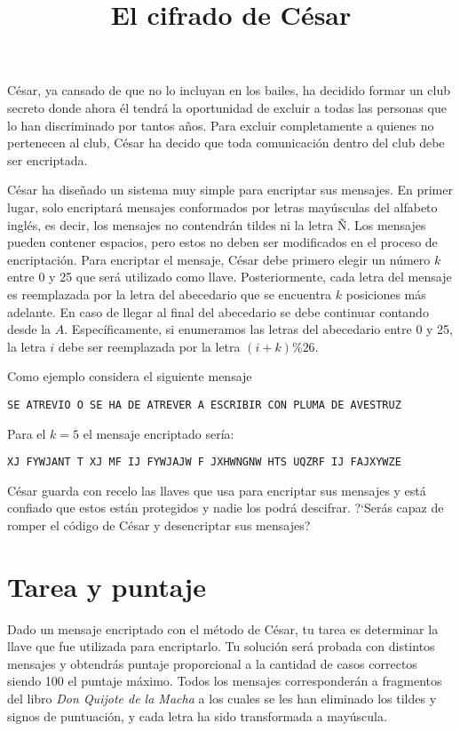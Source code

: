 \documentclass{oci}
\title{El cifrado de César}
\begin{document}
\begin{problemDescription}
César, ya cansado de que no lo incluyan en los bailes, ha decidido formar un club secreto
donde ahora él tendrá la oportunidad de excluir a todas las personas que lo han discriminado por
tantos años.
Para excluir completamente a quienes no pertenecen al club, César ha decido que toda comunicación
dentro del club debe ser encriptada.

César ha diseñado un sistema muy simple para encriptar sus mensajes.
En primer lugar, solo encriptará mensajes conformados por letras mayúsculas del alfabeto
inglés, es decir, los mensajes no contendrán tildes ni la letra Ñ.
Los mensajes pueden contener espacios, pero estos no deben ser modificados en el proceso de
encriptación.
Para encriptar el mensaje, César debe primero elegir un número $k$ entre 0 y 25 que será
utilizado como llave.
Posteriormente, cada letra del mensaje es reemplazada por la letra del abecedario que se
encuentra $k$ posiciones más adelante.
En caso de llegar al final del abecedario se debe continuar contando desde la $A$.
Específicamente, si enumeramos las letras del abecedario entre 0 y 25, la letra $i$ debe ser
reemplazada por la letra $(i+k)\% 26$.

Como ejemplo considera el siguiente mensaje
\begin{center}
  \texttt{SE ATREVIO O SE HA DE ATREVER A ESCRIBIR CON PLUMA DE AVESTRUZ}
\end{center}
Para el $k=5$ el mensaje encriptado sería:
\begin{center}
  \texttt{XJ FYWJANT T XJ MF IJ FYWJAJW F JXHWNGNW HTS UQZRF IJ FAJXYWZE}
\end{center}

César guarda con recelo las llaves que usa para encriptar sus mensajes y está confiado que
estos están protegidos y nadie los podrá descifrar.
?`Serás capaz de romper el código de César y desencriptar sus mensajes?

\end{problemDescription}

\section*{Tarea y puntaje}
Dado un mensaje encriptado con el método de César, tu tarea es determinar la llave que fue
utilizada para encriptarlo.
Tu solución será probada con distintos mensajes y obtendrás puntaje proporcional a la cantidad
de casos correctos siendo 100 el puntaje máximo.
Todos los mensajes corresponderán a fragmentos del libro \emph{Don Quijote de la Macha} a los
cuales se les han eliminado los tildes y signos de puntuación, y cada letra ha sido transformada
a mayúscula.
\end{document}
